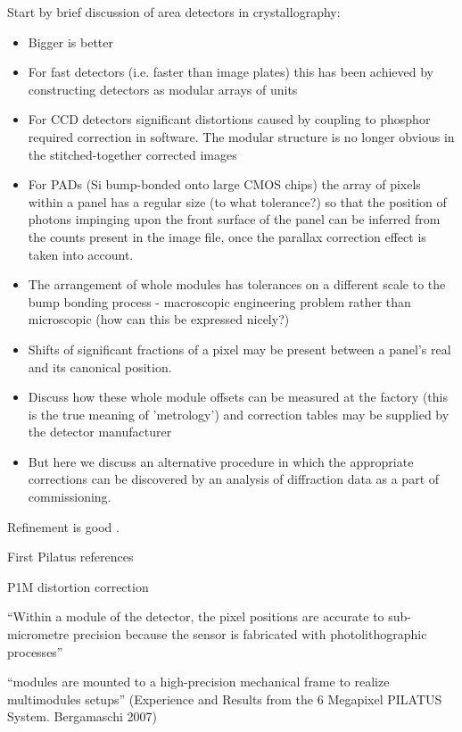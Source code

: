 \documentclass[preprint]{iucr}              %
\begin{document}
Start by brief discussion of area detectors in crystallography:

\begin{itemize}
  \item Bigger is better
  \item For fast detectors (i.e. faster than image plates) this has been
  achieved by constructing detectors as modular arrays of units
  \item For CCD detectors significant distortions caused by coupling to
  phosphor required correction in software. The modular structure is no
  longer obvious in the stitched-together corrected images
  \item For PADs (Si bump-bonded onto large CMOS chips) the array of pixels
  within a panel has a regular size (to what tolerance?) so that the
  position of photons impinging upon the front surface of the panel can be
  inferred from the counts present in the image file, once the parallax
  correction effect is taken into account.
  \item The arrangement of whole modules has tolerances on a different scale
  to the bump bonding process - macroscopic engineering problem rather than
  microscopic (how can this be expressed nicely?)
  \item Shifts of significant fractions of a pixel may be present between a
  panel's real and its canonical position.
  \item Discuss how these whole module offsets can be measured at the
  factory (this is the true meaning of 'metrology') and correction tables
  may be supplied by the detector manufacturer
  \item But here we discuss an alternative procedure in which the
  appropriate corrections can be discovered by an analysis of diffraction
  data as a part of commissioning.
\end{itemize}

Refinement is good \cite{Waterman2016}.

First Pilatus references \cite{Hulsen2006Pilatus1M,Broennimann2006}

P1M distortion correction \cite{Hulsen2005P1MDistortion}

``Within a module of the detector, the pixel positions are accurate to
sub-micrometre precision because the sensor is fabricated with
photolithographic processes'' \cite{Hulsen2006Pilatus1M}

``modules are mounted to a high-precision mechanical frame to realize
multimodules setups'' (Experience and Results from the 6 Megapixel PILATUS
System. Bergamaschi 2007)
\end{document}
